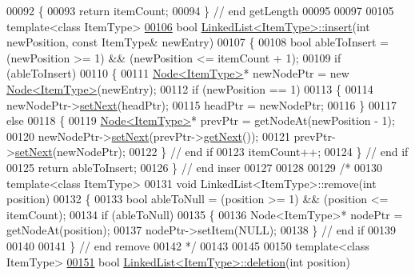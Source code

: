\begin{DoxyCode}
00092 \textcolor{keyword}{}\{
00093    \textcolor{keywordflow}{return} itemCount;
00094 \}  \textcolor{comment}{// end getLength}
00095 
00097 
00105 \textcolor{keyword}{template}<\textcolor{keyword}{class} ItemType>
\hyperlink{classLinkedList_ae8a19375505e87e2e4fc0e9b5afe4d4d}{00106} \textcolor{keywordtype}{bool} \hyperlink{classLinkedList_ae8a19375505e87e2e4fc0e9b5afe4d4d}{LinkedList<ItemType>::insert}(\textcolor{keywordtype}{int} newPosition, \textcolor{keyword}{const} ItemType& newEntry)
00107 \{
00108    \textcolor{keywordtype}{bool} ableToInsert = (newPosition >= 1) && (newPosition <= itemCount + 1);
00109    \textcolor{keywordflow}{if} (ableToInsert)
00110    \{
00111       \hyperlink{classNode}{Node<ItemType>}* newNodePtr = \textcolor{keyword}{new} \hyperlink{classNode}{Node<ItemType>}(newEntry);  
00112       \textcolor{keywordflow}{if} (newPosition == 1)
00113       \{
00114          newNodePtr->\hyperlink{classNode_a01c1a66d4e39f5b149e090413deb4633}{setNext}(headPtr); 
00115          headPtr = newNodePtr;
00116       \}
00117       \textcolor{keywordflow}{else}
00118       \{
00119          \hyperlink{classNode}{Node<ItemType>}* prevPtr = getNodeAt(newPosition - 1);
00120          newNodePtr->\hyperlink{classNode_a01c1a66d4e39f5b149e090413deb4633}{setNext}(prevPtr->\hyperlink{classNode_a3eb0c96e03a3fd46ea1cff4c305bbedd}{getNext}()); 
00121          prevPtr->\hyperlink{classNode_a01c1a66d4e39f5b149e090413deb4633}{setNext}(newNodePtr);
00122       \}  \textcolor{comment}{// end if}
00123       itemCount++; 
00124    \}  \textcolor{comment}{// end if}
00125    \textcolor{keywordflow}{return} ableToInsert;
00126 \}  \textcolor{comment}{// end inser}
00127 
00128 
00129 \textcolor{comment}{/*}
00130 \textcolor{comment}{template<class ItemType>}
00131 \textcolor{comment}{void LinkedList<ItemType>::remove(int position)}
00132 \textcolor{comment}{\{}
00133 \textcolor{comment}{       bool ableToNull = (position >= 1) && (position <= itemCount);}
00134 \textcolor{comment}{       if (ableToNull)}
00135 \textcolor{comment}{       \{}
00136 \textcolor{comment}{          Node<ItemType>* nodePtr = getNodeAt(position);}
00137 \textcolor{comment}{          nodePtr->setItem(NULL);}
00138 \textcolor{comment}{       \}  // end if}
00139 \textcolor{comment}{    }
00140 \textcolor{comment}{}
00141 \textcolor{comment}{\}  // end remove}
00142 \textcolor{comment}{*/}
00143 
00145 
00150 \textcolor{keyword}{template}<\textcolor{keyword}{class} ItemType>
\hyperlink{classLinkedList_a7dc3cca217b45c6fe5d28c9d16b7bf9e}{00151} \textcolor{keywordtype}{bool} \hyperlink{classLinkedList_a7dc3cca217b45c6fe5d28c9d16b7bf9e}{LinkedList<ItemType>::deletion}(\textcolor{keywordtype}{int} position)

\end{DoxyCode}
